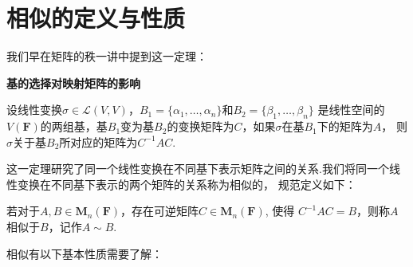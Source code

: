 \section{相似的定义与性质}
我们早在矩阵的秩一讲中提到这一定理：
\begin{theorem}
    \textbf{\heiti 基的选择对映射矩阵的影响}

    设线性变换$\sigma \in \mathcal{L}(V,V)$，$B_1=\{\alpha_1,\ldots,\alpha_n\}$和$B_2=\{\beta_1,\ldots,\beta_n\}$
    是线性空间的$V(\mathbf{F})$的两组基，基$B_1$变为基$B_2$的变换矩阵为$C$，如果$\sigma$在基$B_1$下的矩阵为$A$，
    则$\sigma$关于基$B_2$所对应的矩阵为$C^{-1}AC$.
\end{theorem}
这一定理研究了同一个线性变换在不同基下表示矩阵之间的关系.我们将同一个线性变换在不同基下表示的两个矩阵的关系称为相似的，
规范定义如下：
\begin{definition}
    若对于$A,B\in \mathbf{M}_n(\mathbf{F})$，存在可逆矩阵$C\in \mathbf{M}_n(\mathbf{F})$, 使得
    $C^{-1}AC=B$，则称$A$相似于$B$，记作$A\sim B$.
\end{definition}
相似有以下基本性质需要了解：
